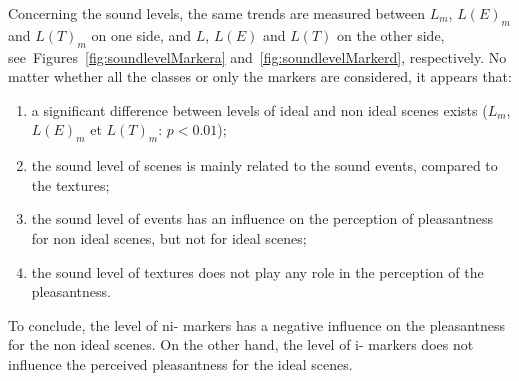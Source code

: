\documentclass[12pt]{elsarticle}
\newcommand{\cf}{cf.}
\begin{document}
Concerning the sound levels, the same trends are measured between $L_m$, $L(E)_m$ and $L(T)_m$ on one side, and $L$, $L(E)$ and $L(T)$ on the other side, see~Figures~\ref{fig:soundlevelMarkera} and~\ref{fig:soundlevelMarkerd}, respectively. No matter whether all the classes or only the markers are considered, it appears that:


\begin{enumerate}
\item a significant difference between levels of ideal and non ideal scenes exists ($L_m$, $L(E)_m$ et $L(T)_m$: $p<0.01$);
\item the sound level of scenes is mainly related to the sound events, compared to the textures;
\item the sound level of events has an influence on the perception of pleasantness for non ideal scenes, but not for ideal scenes;
\item the sound level of textures does not play any role in the perception of the pleasantness.
\end{enumerate}


To conclude, the level of ni- markers has a negative influence on the pleasantness for the non ideal scenes. On the other hand, the level of i- markers does not influence the perceived pleasantness for the ideal scenes.

\end{document}
